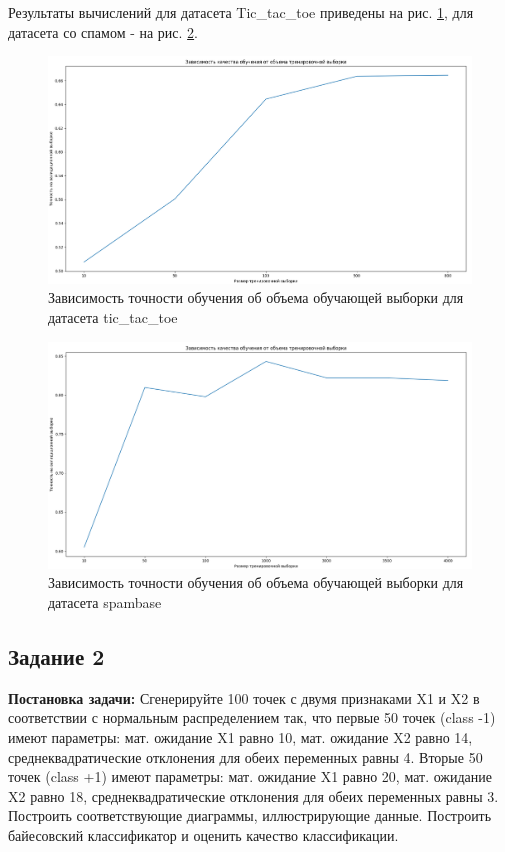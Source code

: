\documentclass[a4paper,14pt]{article}
\begin{document}
Результаты вычислений для датасета Tic\_tac\_toe приведены на рис. \ref{graph:tic_acc}, для датасета со спамом - на рис. \ref{graph:spam_acc}.

\begin{figure}[H]
\includegraphics[width=\textwidth, keepaspectratio]{tic_acc.png}
\caption{Зависимость точности обучения об объема обучающей выборки для датасета tic\_tac\_toe}
\label{graph:tic_acc}
\end{figure}

\begin{figure}[H]
\includegraphics[width=\textwidth, keepaspectratio]{spam_acc.png}
\caption{Зависимость точности обучения об объема обучающей выборки для датасета spambase}
\label{graph:spam_acc}
\end{figure}


\subsection{Задание 2}

\textbf{Постановка задачи:}
Сгенерируйте 100 точек с двумя признаками X1 и X2 в соответствии с нормальным распределением так, что первые 50 точек (class -1) имеют параметры: мат. ожидание X1  равно 10, мат. ожидание X2 равно 14, среднеквадратические отклонения для обеих переменных равны 4. Вторые 50 точек (class +1) имеют параметры: мат. ожидание X1 равно 20, мат. ожидание X2 равно 18, среднеквадратические отклонения для обеих переменных равны 3. Построить соответствующие диаграммы, иллюстрирующие данные. Построить байесовский классификатор и оценить качество классификации. \\
\end{document}
